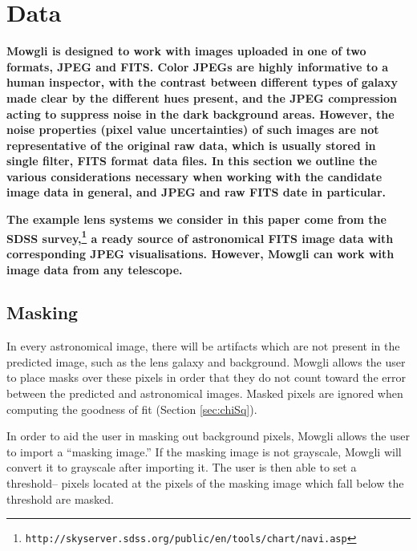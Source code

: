\documentclass[iop]{emulateapj}
\def\theapplet{{\sc Mowgli}\xspace}
\def\NEW#1{{\bf{#1}}}
\begin{document}

\section{Data}
\label{sec:data}

\NEW{\theapplet is designed to work with images uploaded in one of two
formats, JPEG and FITS. Color JPEGs are highly informative to a human inspector,
with the contrast between different types of galaxy made clear by the different
hues present, and the JPEG compression acting to suppress noise in the dark
background areas. However, the noise properties (pixel value uncertainties)
of such images are not representative of the original raw data, which is
usually stored in single filter, FITS format data files. In this section we
outline the various considerations necessary when working with the candidate 
image data in general, and JPEG and raw FITS date in particular.}

\NEW{The example lens systems we consider in this paper come from the SDSS
survey,\footnote{\texttt{http://skyserver.sdss.org/public/en/tools/chart/navi.asp}}
a ready source of astronomical FITS image data with corresponding JPEG
visualisations. However, \theapplet can work with image data from any
telescope.}


\subsection{Masking}
\label{sec:masking}

In every astronomical image, there will be artifacts which are not present
in the predicted image, such as the lens galaxy and background. \theapplet
allows the user to place masks over these pixels in order that they do not
count toward the error between the predicted and astronomical images.
Masked pixels are ignored when computing the goodness of fit (Section
\ref{sec:chiSq}).

In order to aid the user in masking out background pixels, \theapplet allows
the user to import a ``masking image.'' If the masking image is not grayscale,
\theapplet will convert it to grayscale after importing it. The user is then
able to set a threshold-- pixels located at the pixels of the masking image
which fall below the threshold are masked.
\end{document}
